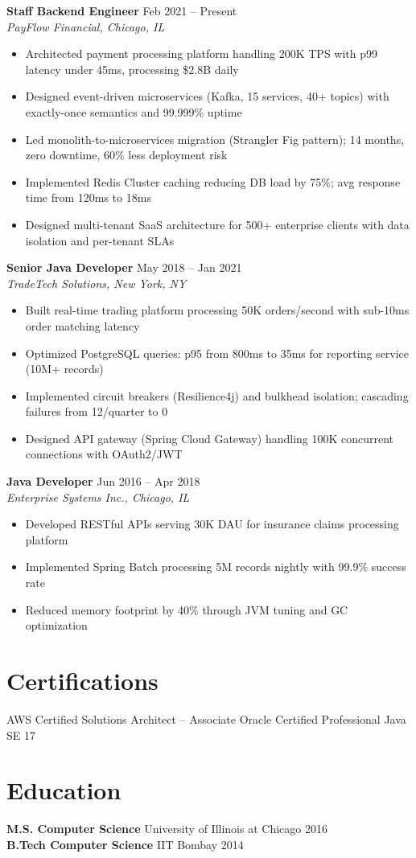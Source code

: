 \documentclass[10pt,a4paper]{article}
\begin{document}
\textbf{Staff Backend Engineer} \hfill Feb 2021 -- Present\\
\textit{\color{accent}PayFlow Financial, Chicago, IL}
\begin{itemize}
  \item Architected payment processing platform handling 200K TPS with p99 latency under 45ms, processing \$2.8B daily
  \item Designed event-driven microservices (Kafka, 15 services, 40+ topics) with exactly-once semantics and 99.999\% uptime
  \item Led monolith-to-microservices migration (Strangler Fig pattern); 14 months, zero downtime, 60\% less deployment risk
  \item Implemented Redis Cluster caching reducing DB load by 75\%; avg response time from 120ms to 18ms
  \item Designed multi-tenant SaaS architecture for 500+ enterprise clients with data isolation and per-tenant SLAs
\end{itemize}

\textbf{Senior Java Developer} \hfill May 2018 -- Jan 2021\\
\textit{\color{accent}TradeTech Solutions, New York, NY}
\begin{itemize}
  \item Built real-time trading platform processing 50K orders/second with sub-10ms order matching latency
  \item Optimized PostgreSQL queries: p95 from 800ms to 35ms for reporting service (10M+ records)
  \item Implemented circuit breakers (Resilience4j) and bulkhead isolation; cascading failures from 12/quarter to 0
  \item Designed API gateway (Spring Cloud Gateway) handling 100K concurrent connections with OAuth2/JWT
\end{itemize}

\textbf{Java Developer} \hfill Jun 2016 -- Apr 2018\\
\textit{\color{accent}Enterprise Systems Inc., Chicago, IL}
\begin{itemize}
  \item Developed RESTful APIs serving 30K DAU for insurance claims processing platform
  \item Implemented Spring Batch processing 5M records nightly with 99.9\% success rate
  \item Reduced memory footprint by 40\% through JVM tuning and GC optimization
\end{itemize}

\section{Certifications}
AWS Certified Solutions Architect -- Associate \quad\textbar\quad Oracle Certified Professional Java SE 17

\section{Education}
\textbf{M.S. Computer Science} \hfill University of Illinois at Chicago \hfill 2016\\
\textbf{B.Tech Computer Science} \hfill IIT Bombay \hfill 2014
\end{document}
